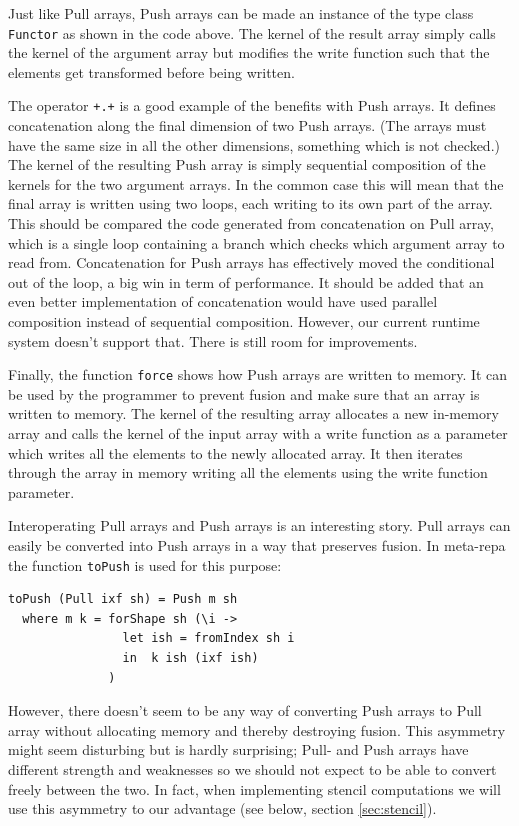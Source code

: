 \documentclass[preprint]{sigplanconf}
\begin{document}
Just like Pull arrays, Push arrays can be made an instance of the type
class \texttt{Functor} as shown in the code above. The kernel of the
result array simply calls the kernel of the argument array but modifies
the write function such that the elements get transformed before being
written.

The operator \texttt{+.+} is a good example of the benefits with Push
arrays. It defines concatenation along the final dimension of two Push
arrays. (The arrays must have the same size in all the other dimensions,
something which is not checked.) The kernel of the resulting Push array
is simply sequential composition of the kernels for the two argument
arrays. In the common case this will mean that the final array is
written using two loops, each writing to its own part of the array. This
should be compared the code generated from concatenation on Pull array,
which is a single loop containing a branch which checks which argument
array to read from. Concatenation for Push arrays has effectively moved
the conditional out of the loop, a big win in term of performance. It
should be added that an even better implementation of concatenation
would have used parallel composition instead of sequential composition.
However, our current runtime system doesn't support that. There is still
room for improvements.

Finally, the function \texttt{force} shows how Push arrays are written
to memory. It can be used by the programmer to prevent fusion and make
sure that an array is written to memory. The kernel of the resulting
array allocates a new in-memory array and calls the kernel of the input
array with a write function as a parameter which writes all the elements
to the newly allocated array. It then iterates through the array in
memory writing all the elements using the write function parameter.

Interoperating Pull arrays and Push arrays is an interesting story. Pull
arrays can easily be converted into Push arrays in a way that preserves
fusion. In meta-repa the function \texttt{toPush} is used for this
purpose:

\begin{verbatim}
toPush (Pull ixf sh) = Push m sh
  where m k = forShape sh (\i ->
                let ish = fromIndex sh i
                in  k ish (ixf ish)
              )
\end{verbatim}

However, there doesn't seem to be any way of converting Push arrays to
Pull array without allocating memory and thereby destroying fusion. This
asymmetry might seem disturbing but is hardly surprising; Pull- and Push
arrays have different strength and weaknesses so we should not expect to
be able to convert freely between the two. In fact, when implementing
stencil computations we will use this asymmetry to our advantage (see
below, section \ref{sec:stencil}).
\end{document}
